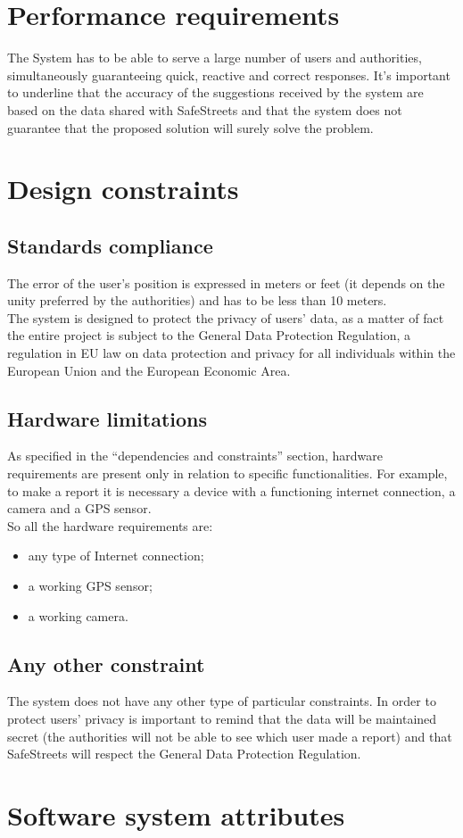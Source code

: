 \documentclass[12pt,a4paper]{report}
\begin{document}
			
	
	\section{Performance requirements}
		The System has to be able to serve a large number of users and authorities, simultaneously guaranteeing quick, 
		reactive and correct responses. It's important to underline that the accuracy of the suggestions received by the system
		are based on the data shared with SafeStreets and that the system does not guarantee that the proposed solution will surely
		solve the problem.
	\section{Design constraints}
		\subsection{Standards compliance}
			The error of the user's position is expressed in meters or feet (it depends on the unity preferred by the authorities) and has to be less than 10 meters.\\
			The system is designed to protect the privacy of users' data, as a matter of fact the entire 
			project is subject to the General Data Protection Regulation, a regulation in EU 
			law on data protection and privacy for all individuals within the European Union and 
			the European Economic Area.
		\subsection{Hardware limitations}
			As specified in the ``dependencies and constraints” section, hardware requirements are present 
			only in relation to specific functionalities. For example, to make a report it is necessary a device with
			a functioning internet connection, a camera and a GPS sensor.\\
			So all the hardware requirements are:
			\begin{itemize}
				\item any type of Internet connection;
				\item a working GPS sensor;
				\item a working camera.
			\end{itemize}
		\subsection{Any other constraint}
			The system does not have any other type of particular constraints. In order to protect users' privacy is important
			to remind that the data will be maintained secret (the authorities will not be able to see which user made a report)
			and that SafeStreets will respect the General Data Protection Regulation.	\section{Software system attributes}
\end{document}
